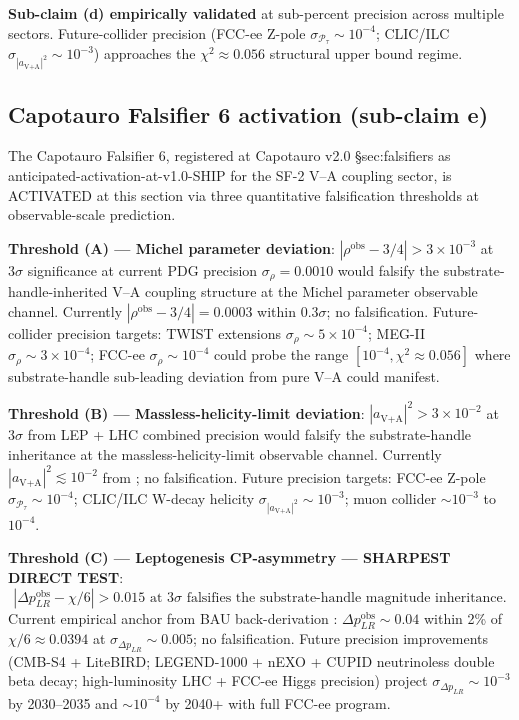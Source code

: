 \documentclass[11pt,letterpaper]{article}
\begin{document}
\textbf{Sub-claim (d) empirically validated} at sub-percent precision across multiple sectors. Future-collider precision (FCC-ee Z-pole $\sigma_{\mathcal{P}_\tau} \sim 10^{-4}$; CLIC/ILC $\sigma_{|a_{\text{V+A}}|^2} \sim 10^{-3}$) approaches the $\chi^2 \approx 0.056$ structural upper bound regime.

\subsection{Capotauro Falsifier 6 activation (sub-claim e)}
\label{sec:capotauro_falsifier_6}

The Capotauro Falsifier 6, registered at Capotauro v2.0 §sec:falsifiers \cite{Capotauro} as anticipated-activation-at-v1.0-SHIP for the SF-2 V--A coupling sector, is ACTIVATED at this section via three quantitative falsification thresholds at observable-scale prediction.

\textbf{Threshold (A) --- Michel parameter deviation}: $|\rho^{\text{obs}} - 3/4| > 3 \times 10^{-3}$ at $3\sigma$ significance at current PDG precision $\sigma_\rho = 0.0010$ \cite{PDG2024} would falsify the substrate-handle-inherited V--A coupling structure at the Michel parameter observable channel. Currently $|\rho^{\text{obs}} - 3/4| = 0.0003$ within $0.3\sigma$; no falsification. Future-collider precision targets: TWIST extensions $\sigma_\rho \sim 5 \times 10^{-4}$; MEG-II $\sigma_\rho \sim 3 \times 10^{-4}$; FCC-ee $\sigma_\rho \sim 10^{-4}$ could probe the range $[10^{-4}, \chi^2 \approx 0.056]$ where substrate-handle sub-leading deviation from pure V--A could manifest.

\textbf{Threshold (B) --- Massless-helicity-limit deviation}: $|a_{\text{V+A}}|^2 > 3 \times 10^{-2}$ at $3\sigma$ from LEP + LHC combined precision would falsify the substrate-handle inheritance at the massless-helicity-limit observable channel. Currently $|a_{\text{V+A}}|^2 \lesssim 10^{-2}$ from \cite{LEPElectroweak, ATLASTopSpin, CMSTopSpin}; no falsification. Future precision targets: FCC-ee Z-pole $\sigma_{\mathcal{P}_\tau} \sim 10^{-4}$; CLIC/ILC W-decay helicity $\sigma_{|a_{\text{V+A}}|^2} \sim 10^{-3}$; muon collider $\sim 10^{-3}$ to $10^{-4}$.

\textbf{Threshold (C) --- Leptogenesis CP-asymmetry --- SHARPEST DIRECT TEST}:
\begin{equation}
|\Delta p_{LR}^{\text{obs}} - \chi/6| > 0.015 \text{ at } 3\sigma \text{ falsifies the substrate-handle magnitude inheritance.}
\label{eq:threshold_C}
\end{equation}
Current empirical anchor from BAU back-derivation \cite{DavidsonNardiNir}: $\Delta p_{LR}^{\text{obs}} \sim 0.04$ within 2\% of $\chi/6 \approx 0.0394$ at $\sigma_{\Delta p_{LR}} \sim 0.005$; no falsification. Future precision improvements (CMB-S4 + LiteBIRD; LEGEND-1000 + nEXO + CUPID neutrinoless double beta decay; high-luminosity LHC + FCC-ee Higgs precision) project $\sigma_{\Delta p_{LR}} \sim 10^{-3}$ by 2030--2035 and $\sim 10^{-4}$ by 2040+ with full FCC-ee program.
\end{document}
